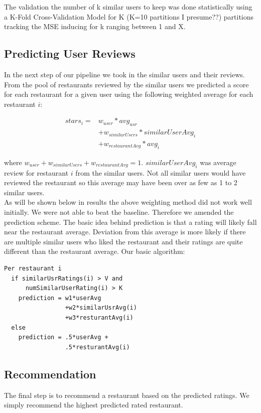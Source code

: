 \documentclass[10pt,twocolumn,letterpaper]{article}
\newcommand{\wu}{\ensuremath{w_{user}}}
\newcommand{\ws}{\ensuremath{w_{similarUsers}}}
\newcommand{\wrst}{\ensuremath{w_{restaurantAvg}}}
\begin{document}
The validation the number of k similar users to keep was done statistically using a K-Fold Cross-Validation Model for K (K=10 partitions I presume??) partitions tracking the MSE inducing for k ranging between 1 and X. 

\subsection{Predicting User Reviews}
In the next step of our pipeline we took in the similar users and their reviews. From the pool of restaurants reviewed by the similar users we predicted a score for each restaurant for a given user using the following weighted average for each restaurant $i$:

\begin{align*}
stars_{i} = & \wu * avg_{usr}\\
&+ \ws * similarUserAvg_{i}\\
&+ \wrst * avg_{i}
\end{align*}

 where $\wu + \ws + \wrst = 1$. $similarUserAvg_i$ was average review for restaurant $i$ from the similar users. Not all similar users would have reviewed the restaurant so this average may have been over as few as 1 to 2 similar users. 
\\[0.5em]
\indent As will be shown below in results the above weighting method did not work well initially. We were not able to beat the baseline. Therefore we amended the prediction scheme. The basic idea behind prediction is that a rating will likely fall near the restaurant average. Deviation from this average is more likely if there are multiple similar users who liked the restaurant and their ratings are quite different than the restaurant average. Our basic algorithm:
\begin{verbatim}
Per restaurant i
  if similarUsrRatings(i) > V and
      numSimilarUserRating(i) > K
    prediction = w1*userAvg
                 +w2*similarUsrAvg(i)
                 +w3*resturantAvg(i)
  else
    prediction = .5*userAvg +
                 .5*resturantAvg(i)
\end{verbatim}

\subsection{Recommendation}
The final step is to recommend a restaurant based on the predicted ratings. We simply recommend the highest predicted rated restaurant.
\end{document}
